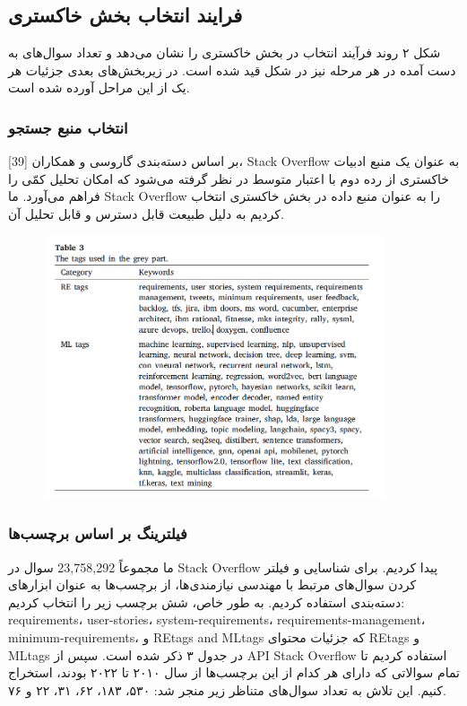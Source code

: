 \documentclass[a4paper,10pt]{article}
\begin{document}
        \subsection{فرایند انتخاب بخش خاکستری}

            شکل ۲ روند فرآیند انتخاب در بخش خاکستری را نشان می‌دهد و تعداد سوال‌های به دست آمده در هر مرحله نیز در شکل قید شده است. در زیربخش‌های بعدی جزئیات هر یک از این مراحل آورده شده است.
        
                \subsubsection{انتخاب منبع جستجو}

                    بر اساس دسته‌بندی گاروسی و همکاران [39]، Stack Overflow به عنوان یک منبع ادبیات خاکستری از رده دوم با اعتبار متوسط در نظر گرفته می‌شود که امکان تحلیل کمّی را فراهم می‌آورد. ما Stack Overflow را به عنوان منبع داده در بخش خاکستری انتخاب کردیم به دلیل طبیعت قابل دسترس و قابل تحلیل آن.

                    \begin{figure}
                        \centering
                        \includegraphics[width=0.9\textwidth]{Image/table-3.png}
                    \end{figure}

                \subsubsection{فیلترینگ بر اساس برچسب‌ها}
                    ما مجموعاً 23,758,292 سوال در Stack Overflow پیدا کردیم. برای شناسایی و فیلتر کردن سوال‌های مرتبط با مهندسی نیازمندی‌ها، از برچسب‌ها به عنوان ابزارهای دسته‌بندی استفاده کردیم. به طور خاص، شش برچسب زیر را انتخاب کردیم: requirements، user-stories، system-requirements، requirements-management، minimum-requirements، و REtags and MLtags که جزئیات محتوای REtags و MLtags در جدول ۳ ذکر شده است. سپس از API Stack Overflow استفاده کردیم تا تمام سوالاتی که دارای هر کدام از این برچسب‌ها از سال ۲۰۱۰ تا ۲۰۲۲ بودند، استخراج کنیم. این تلاش به تعداد سوال‌های متناظر زیر منجر شد: ۵۳۰، ۱۸۳، ۶۲، ۳۱، ۲۲ و ۷۶.
\end{document}
